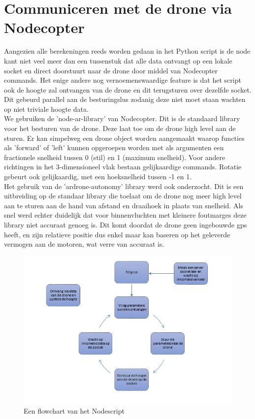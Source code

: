 \section{Communiceren met de drone via Nodecopter}


Aangezien alle berekeningen reeds worden gedaan in het Python script is de node kant niet veel meer dan een tussenstuk dat alle data ontvangt op een lokale socket en direct doorstuurt naar de drone door middel van Nodecopter commands. Het enige andere nog vernoemenswaardige feature is dat het script ook de hoogte zal ontvangen van de drone en dit terugsturen over dezelfde socket. Dit gebeurd parallel aan de besturingslus zodanig deze niet moet staan wachten op niet triviale hoogte data.\\

We gebruiken de 'node-ar-library' van Nodecopter. Dit is de standaard library voor het besturen van de drone. Deze laat toe om de drone high level aan de sturen. Er kan simpelweg een drone object worden aangemaakt waarop functies als 'forward' of 'left' kunnen opgeroepen worden met als argumenten een fractionele snelheid tussen 0 (stil) en 1 (maximum snelheid). Voor andere richtingen in het 3-dimensioneel vlak bestaan gelijkaardige commands. Rotatie gebeurt ook gelijkaardig, met een hoeksnelheid tussen -1 en 1.\\

Het gebruik van de 'ardrone-autonomy' library werd ook onderzocht. Dit is een uitbreiding op de standaar library die toelaat om de drone nog meer high level aan te sturen aan de hand van afstand en draaihoek in plaats van snelheid. Als snel werd echter duidelijk dat voor binnenvluchten met kleinere foutmarges deze library niet accuraat genoeg is. Dit komt doordat de drone geen ingebouwde gps heeft, en zijn relatieve positie dus enkel maar kan baseren op het geleverde vermogen aan de motoren, wat verre van accuraat is.



\begin{figure}[h]
\caption{Een flowchart van het Nodescript}
\centering
\includegraphics[width=\textwidth]{images/node_server_flowchart}
\end{figure}

